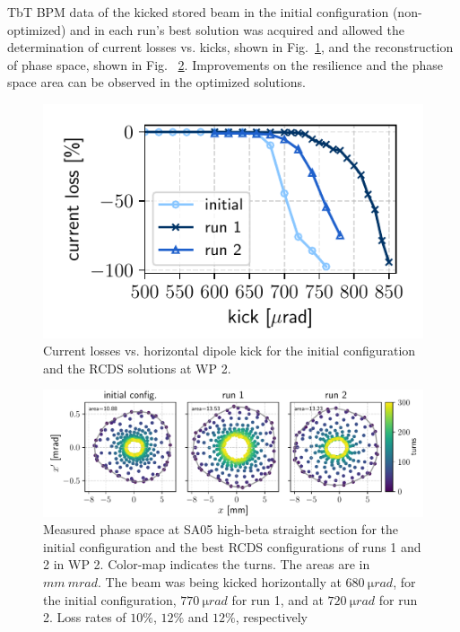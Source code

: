 TbT BPM data of the kicked stored beam  in the initial configuration (non-optimized) and in each run's best solution was acquired and allowed the determination of current losses vs. kicks, shown in Fig.~\ref{fig:loss_kicks_newtunes}, and the reconstruction of phase space, shown in Fig. ~\ref{fig:newtunes_phase}. Improvements on the resilience and the phase space area can be observed in the optimized solutions.
\begin{figure}
    \centering
    \includegraphics[width=0.6\columnwidth]{Images/WEPL087_f3.pdf}
    \caption[Current losses vs. horizontal dipole kick for the initial configuration and the RCDS solutions at WP 2.]{Current losses vs. horizontal dipole kick for the initial configuration and the RCDS solutions at WP 2.}
    \label{fig:loss_kicks_newtunes}
\end{figure}
\begin{figure}[tb]
    \includegraphics[width=\textwidth]{Images/WEPL087_f4.pdf}
    \caption[Measured phase space at SA05 high-beta straight section for the initial configuration and the best RCDS configurations of runs 1 and 2 in WP 2.]{Measured phase space at SA05 high-beta straight section for the initial configuration and the best RCDS configurations of runs 1 and 2 in WP 2. Color-map indicates the turns. The areas are in $\unit{mm}~\unit{mrad}$. The beam was being kicked horizontally at $680~\unit{\micro rad}$, for the initial configuration, $770~\unit{\micro rad}$ for run 1, and at $720~\unit{\micro rad}$ for run 2. Loss rates of $10\%$, $12\%$ and $12\%$, respectively}
    \label{fig:newtunes_phase}
\end{figure}

